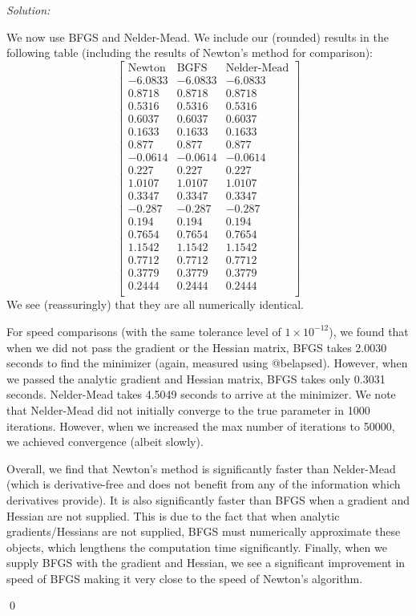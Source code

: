 \documentclass[12pt]{article}
\newenvironment{problem}[2][Problem]{\begin{trivlist}
\item[\hskip \labelsep {\bfseries #1}\hskip \labelsep {\bfseries #2.}]}{\end{trivlist}}
\newenvironment{sol}
    {\emph{Solution:}
    }
    {
    \qed
    }
\begin{document}
\begin{problem}{4}
\end{problem}
\begin{sol}
    We now use BFGS and Nelder-Mead. We include our (rounded) results in the following table (including the results of Newton's method for comparison):
    \[\left[
        \begin{array}{ccc}
            \text{Newton} & \text{BGFS} & \text{Nelder-Mead}  \\
        -6.0833 & -6.0833 & -6.0833 \\
        0.8718 & 0.8718 & 0.8718 \\
        0.5316 & 0.5316 & 0.5316 \\
        0.6037 & 0.6037 & 0.6037 \\
        0.1633 & 0.1633 & 0.1633 \\
        0.877 & 0.877 & 0.877 \\
        -0.0614 & -0.0614 & -0.0614 \\
        0.227 & 0.227 & 0.227 \\
        1.0107 & 1.0107 & 1.0107 \\
        0.3347 & 0.3347 & 0.3347 \\
        -0.287 & -0.287 & -0.287 \\
        0.194 & 0.194 & 0.194 \\
        0.7654 & 0.7654 & 0.7654 \\
        1.1542 & 1.1542 & 1.1542 \\
        0.7712 & 0.7712 & 0.7712 \\
        0.3779 & 0.3779 & 0.3779 \\
        0.2444 & 0.2444 & 0.2444 \\
        \end{array}
        \right]\]
        We see (reassuringly) that they are all numerically identical. 

        For speed comparisons (with the same tolerance level of $1\times 10^{-12}$), we found that when we did not pass the gradient or the Hessian matrix, BFGS takes 2.0030 seconds to find the minimizer (again, measured using @belapsed). However, when we passed the analytic gradient and Hessian matrix, BFGS takes only 0.3031 seconds. Nelder-Mead takes 4.5049 seconds to arrive at the minimizer. We note that Nelder-Mead did not initially converge to the true parameter in 1000 iterations. However, when we increased the max number of iterations to 50000, we achieved convergence (albeit slowly).

        Overall, we find that Newton's method is significantly faster than Nelder-Mead (which is derivative-free and does not benefit from any of the information which derivatives provide). It is also significantly faster than BFGS when a gradient and Hessian are not supplied. This is due to the fact that when analytic gradients/Hessians are not supplied, BFGS must numerically approximate these objects, which lengthens the computation time significantly. Finally, when we supply BFGS with the gradient and Hessian, we see a significant improvement in speed of BFGS making it very close to the speed of Newton's algorithm. 
\end{sol}
\end{document}

